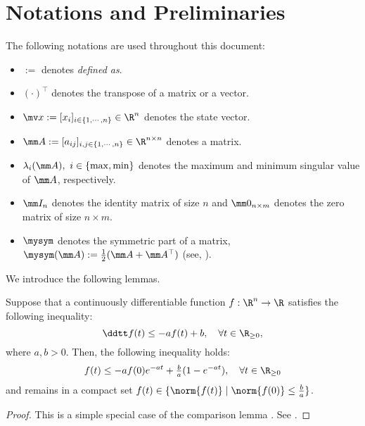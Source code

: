 
\section{Notations and Preliminaries}

The following notations are used throughout this document:
\begin{itemize}
    \item $:=$ denotes \textit{defined as}.
    \item $(\cdot)^\top$ denotes the transpose of a matrix or a vector.
    \item $\bdx:=[x_i]_{i\in\{1,\cdots,n\}}\in\R^n$ denotes the state vector.
    \item $\mm A:=[a_{ij}]_{i,j\in\{1,\cdots,n\}}\in\R^{n\times n}$ denotes a matrix.
    \item $\lambda_{i}(\mm A),\ i\in\{\max,\min\}$ denotes the maximum and minimum singular value of $\mm A$, respectively.
    \item $\mm I_n$ denotes the identity matrix of size $n$ and $\mm 0_{n\times m}$ denotes the zero matrix of size $n\times m$.
    \item $\mysym$ denotes the symmetric part of a matrix, \ie $\mysym(\mm A):=\tfrac{1}{2}(\mm A+\mm A^\top)$ (see, \cite{Tsukamoto:2021ac}).
\end{itemize}

We introduce the following lemmas.

\begin{lem}
	Suppose that a continuously differentiable function $f:\R^n\to\R$ satisfies the following inequality:
	\begin{equation}
		\ddtt f(t)\le -a f(t)+ b, \quad \forall t\in\R_{\ge 0}
		,
	\end{equation}
	where $a,b>0$.
	Then, the following inequality holds:
	\begin{equation}
		f(t)\le -af(0)e^{-at} + \tfrac{b}{a}(1-e^{-at}), \quad \forall t\in\R_{\ge 0}
	\end{equation}
	and remains in a compact set $f(t)\in\{\norm{f(t)} \mid \norm{f(0)}\le \tfrac{b}{a}\}$.
	\label{lem:comparison}
\end{lem}

\begin{proof}
	This is a simple special case of the comparison lemma \cite[pp. 102-103]{Khalil:2002aa}.
	See \cite[pp. 659-660]{Khalil:2002aa}.
\end{proof}
